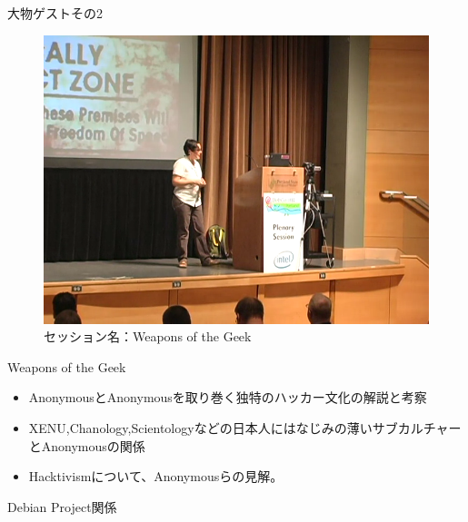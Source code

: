 \begin{frame}{大物ゲストその2}

\begin{figure}[H]
\begin{center}
 \includegraphics[width=0.6\hsize]{image201409/weapon_geek.png}
\end{center}
\caption{セッション名：Weapons of the Geek}
\end{figure}


\end{frame}

\begin{frame}{Weapons of the Geek}

 \begin{itemize}
   \item AnonymousとAnonymousを取り巻く独特のハッカー文化の解説と考察
   \item XENU,Chanology,Scientologyなどの日本人にはなじみの薄いサブカルチャーとAnonymousの関係
   \item Hacktivismについて、Anonymousらの見解。
 \end{itemize}

\end{frame}

\begin{frame}{Debian Project関係}


\end{frame} 

